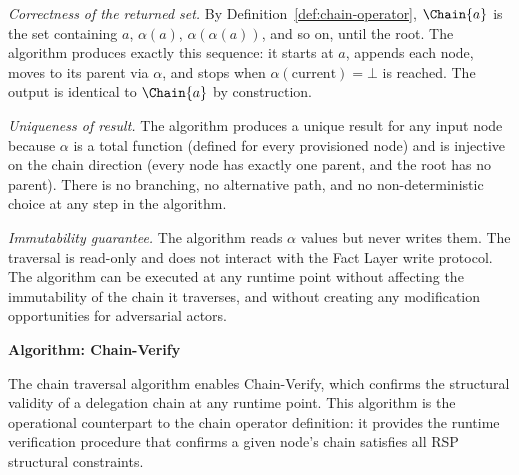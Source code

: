 \textit{Correctness of the returned set.} By Definition~\ref{def:chain-operator}, $\Chain{a}$ is the set containing $a$, $\alpha(a)$, $\alpha(\alpha(a))$, and so on, until the root. The algorithm produces exactly this sequence: it starts at $a$, appends each node, moves to its parent via $\alpha$, and stops when $\alpha(\text{current}) = \bot$ is reached. The output is identical to $\Chain{a}$ by construction.

\textit{Uniqueness of result.} The algorithm produces a unique result for any input node because $\alpha$ is a total function (defined for every provisioned node) and is injective on the chain direction (every node has exactly one parent, and the root has no parent). There is no branching, no alternative path, and no non-deterministic choice at any step in the algorithm.

\textit{Immutability guarantee.} The algorithm reads $\alpha$ values but never writes them. The traversal is read-only and does not interact with the Fact Layer write protocol. The algorithm can be executed at any runtime point without affecting the immutability of the chain it traverses, and without creating any modification opportunities for adversarial actors.

\bigskip
\noindent\textbf{Algorithm: Chain-Verify}

The chain traversal algorithm enables Chain-Verify, which confirms the structural validity of a delegation chain at any runtime point. This algorithm is the operational counterpart to the chain operator definition: it provides the runtime verification procedure that confirms a given node's chain satisfies all RSP structural constraints.


